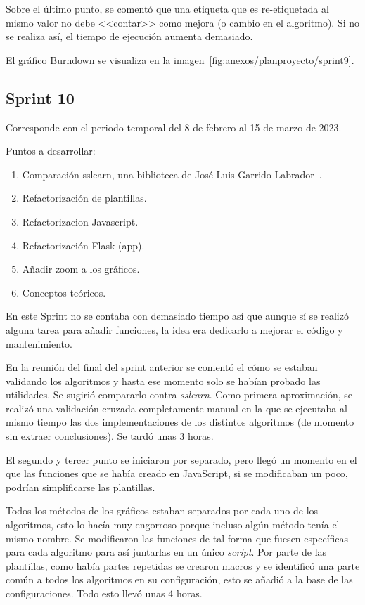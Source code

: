 Sobre el último punto, se comentó que una etiqueta que es re-etiquetada al mismo
valor no debe <<contar>> como mejora (o cambio en el algoritmo). Si no se
realiza así, el tiempo de ejecución aumenta demasiado.


El gráfico Burndown se visualiza en la imagen~\ref{fig:anexos/planproyecto/sprint9}.

\subsection{Sprint 10}
Corresponde con el periodo temporal del 8 de febrero al 15 de marzo de 2023.

Puntos a desarrollar:
\begin{enumerate}
    \item Comparación sslearn, una biblioteca de José Luis
    Garrido-Labrador~\cite{jose_luis_garrido_labrador_2023_7781117}.
    \item Refactorización de plantillas.
    \item Refactorizacion Javascript.
    \item Refactorización Flask (app).
    \item Añadir zoom a los gráficos.
    \item Conceptos teóricos.
\end{enumerate}

En este Sprint no se contaba con demasiado tiempo así que aunque sí se realizó
alguna tarea para añadir funciones, la idea era dedicarlo a mejorar el código y
mantenimiento.

En la reunión del final del sprint anterior se comentó el cómo se estaban
validando los algoritmos y hasta ese momento solo se habían probado las
utilidades. Se sugirió compararlo contra \textit{sslearn}. Como primera
aproximación, se realizó una validación cruzada completamente manual en la que
se ejecutaba al mismo tiempo las dos implementaciones de los distintos
algoritmos (de momento sin extraer conclusiones). Se tardó unas 3 horas.

El segundo y tercer punto se iniciaron por separado, pero llegó un momento en el
que las funciones que se había creado en JavaScript, si se modificaban un poco,
podrían simplificarse las plantillas. 

Todos los métodos de los gráficos estaban separados por cada uno de los
algoritmos, esto lo hacía muy engorroso porque incluso algún método tenía el
mismo nombre. Se modificaron las funciones de tal forma que fuesen específicas
para cada algoritmo para así juntarlas en un único \textit{script}. Por parte de
las plantillas, como había partes repetidas se crearon macros y se identificó
una parte común a todos los algoritmos en su configuración, esto se añadió a la
base de las configuraciones. Todo esto llevó unas 4 horas.

